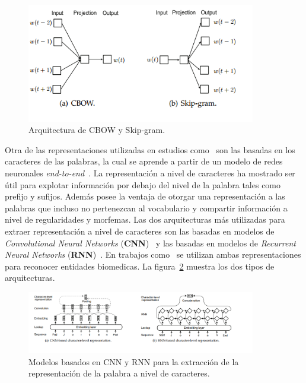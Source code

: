 \begin{figure}[h!]
	\centering
	\includegraphics[width = 10cm]{Graphics/CBOW_SkipGram.png}
	\caption{Arquitectura de CBOW y Skip-gram.}\label{fig:cbowSkip}
\end{figure}


Otra de las representaciones utilizadas en estudios como~\cite{li2018segbot} son las basadas en los caracteres de las palabras, la cual se aprende a partir de un modelo de redes neuronales \emph{end-to-end}~\cite{li2018survey}. La representaci\'on a nivel de caracteres ha mostrado ser \'util para explotar informaci\'on por debajo del nivel de la palabra tales como prefijo y sufijos. Adem\'as posee la ventaja de otorgar una representaci\'on a las palabras que incluso no pertenezcan al vocabulario y compartir informaci\'on a nivel de regularidades y morfemas. Las dos arquitecturas m\'as utilizadas para extraer representaci\'on a nivel de caracteres son las basadas en modelos de \emph{Convolutional Neural Networks} (\textbf{CNN})~\cite{ma2016end} y las basadas en modelos de \emph{Recurrent Neural Networks} (\textbf{RNN})~\cite{lample2016neural}. En trabajos como~\cite{gridach2017character} se utilizan ambas representaciones para reconocer entidades biomedicas. La figura~\ref{fig:charLevel} muestra los dos tipos de arquitecturas.

\begin{figure}[h!]
	\centering
	\includegraphics[width = 10cm]{Graphics/charEmb.png}
	\caption{Modelos basados en CNN y RNN para la extracci\'on de la representaci\'on de la palabra a nivel de caracteres.}\label{fig:charLevel}
\end{figure}

